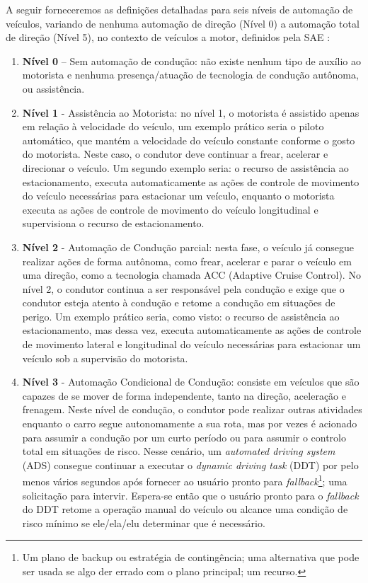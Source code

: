 A seguir forneceremos as definições detalhadas para seis níveis de automação de veículos, variando de nenhuma automação de direção (Nível 0) a automação total de direção (Nível 5), no contexto de veículos a motor, definidos pela SAE \cite{SAE}:
\begin{enumerate} \label{SAE-level}
 \item \textbf{Nível 0} – Sem automação de condução: não existe nenhum tipo de auxílio ao motorista e nenhuma presença/atuação de tecnologia de condução autônoma, ou assistência.
\item \textbf{Nível 1} - Assistência ao Motorista: no nível 1, o motorista é assistido apenas em relação à velocidade do veículo, um exemplo prático seria o piloto automático, que mantém a velocidade do veículo constante conforme o gosto do motorista. Neste caso, o condutor deve continuar a frear, acelerar e direcionar o veículo. Um segundo exemplo seria: o recurso de assistência ao estacionamento, executa automaticamente as ações de controle de movimento do veículo necessárias para estacionar um veículo, enquanto o motorista executa as ações de controle de movimento do veículo longitudinal e supervisiona o recurso de estacionamento.
\item \textbf{Nível 2} - Automação de Condução parcial: nesta fase, o veículo já consegue realizar ações de forma autônoma, como frear, acelerar e parar o veículo em uma direção, como a tecnologia chamada ACC (Adaptive Cruise Control). No nível 2, o condutor continua a ser responsável pela condução e exige que o condutor esteja atento à condução e retome a condução em situações de perigo. Um exemplo prático seria, como visto: o recurso de assistência ao estacionamento, mas dessa vez, executa automaticamente as ações de controle de movimento lateral e longitudinal do veículo necessárias para estacionar um veículo sob a supervisão do motorista.
\item \textbf{Nível 3} - Automação Condicional de Condução: consiste em veículos que são capazes de se mover de forma independente, tanto na direção, aceleração e frenagem. Neste nível de condução, o condutor pode realizar outras atividades enquanto o carro segue autonomamente a sua rota, mas por vezes é acionado para assumir a condução por um curto período ou para assumir o controlo total em situações de risco. Nesse cenário, um \textit{automated driving system} (ADS)  consegue continuar a executar o \textit{dynamic driving task} (DDT) por pelo menos vários segundos após fornecer ao usuário pronto para \textit{fallback}\footnote{Um plano de backup ou estratégia de contingência; uma alternativa que pode ser usada se algo der errado com o plano principal; um recurso.}; uma solicitação para intervir. Espera-se então que o usuário pronto para o \textit{fallback} do DDT retome a operação manual do veículo ou alcance uma condição de risco mínimo se ele/ela/elu determinar que é necessário.

\end{enumerate}
